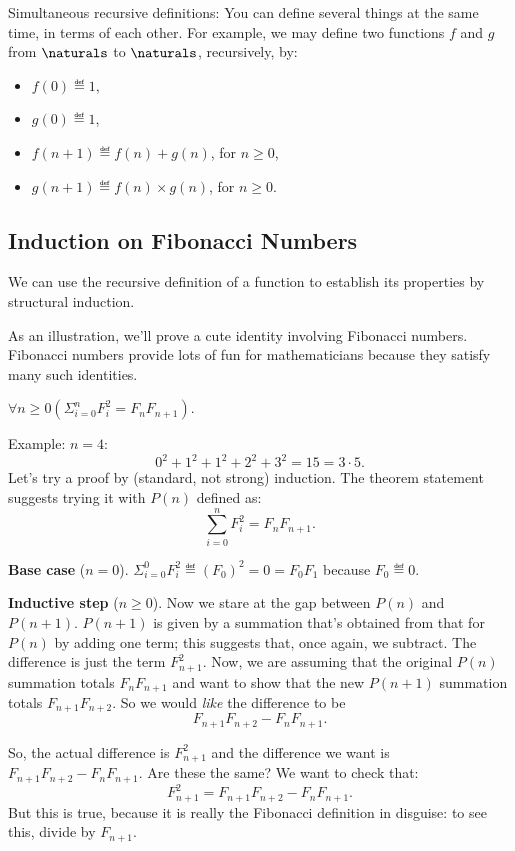 \begin{description}
\begin{staffnotes}

\item[Simultaneous recursive definitions:]
  You can define several things at the same time, in terms of each
  other.  For example, we may define two functions $f$ and $g$ from
  $\naturals$ to $\naturals$, recursively, by:
  \begin{itemize}
  \item
    $f(0) \eqdef 1$,
  \item
    $g(0) \eqdef 1$,
  \item
    $f(n+1) \eqdef f(n) + g(n)$, for $n \geq 0$,
  \item
    $g(n+1) \eqdef f(n) \times g(n)$, for $n \geq 0$.
  \end{itemize}

\end{staffnotes}

\end{description}

\begin{staffnotes}

\subsection{Induction on Fibonacci Numbers}

We can use the recursive definition of a function to establish its
properties by structural induction.

As an illustration, we'll prove a cute identity involving Fibonacci
numbers.  Fibonacci numbers provide lots of fun for mathematicians because
they satisfy many such identities.
\begin{proposition}
  $\forall n \geq 0 (\Sigma_{i=0}^n F_i^2 = F_n F_{n+1})$.
\end{proposition}

Example: $n = 4$:
\[
0^2 + 1^2 + 1^2 + 2^2 + 3^2 = 15 = 3 \cdot 5.
\]
Let's try a proof by (standard, not strong) induction.  The theorem
statement suggests trying it with $P(n)$ defined as:
\[
\sum_{i=0}^n F_i^2 = F_n F_{n+1}.
\]

\textbf{Base case} ($n=0$). 
$\Sigma_{i=0}^0 F_i^2 \eqdef (F_0)^2 = 0 = F_0 F_1$ because
$F_0 \eqdef 0$.

\textbf{Inductive step} ($n\geq 0$).  Now we stare at the gap between
$P(n)$ and $P(n+1)$.  $P(n+1)$ is given by a summation that's obtained
from that for $P(n)$ by adding one term; this suggests that, once again,
we subtract.  The difference is just the term $F_{n+1}^2$.  Now, we are
assuming that the original $P(n)$ summation totals $F_n F_{n+1}$ and want
to show that the new $P(n+1)$ summation totals $F_{n+1} F_{n+2}$.  So we
would {\em like\/} the difference to be
\[
F_{n+1} F_{n+2} - F_n F_{n+1}.
\]

So, the actual difference is $F_{n+1}^2$ and the difference we want is
$F_{n+1} F_{n+2} - F_n F_{n+1}$.  Are these the same?  We want to check
that:
\[
F_{n+1}^2 = F_{n+1} F_{n+2} - F_n F_{n+1}.
\]
But this is true, because it is really the Fibonacci definition in
disguise: to see this, divide by $F_{n+1}$.

\end{staffnotes}

